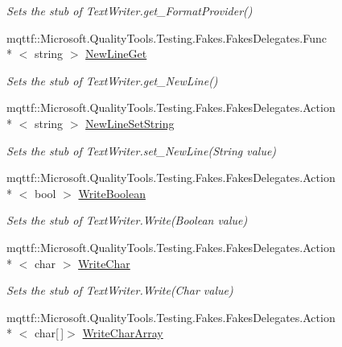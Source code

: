 \begin{DoxyCompactItemize}
\begin{DoxyCompactList}\small\item\em Sets the stub of Text\-Writer.\-get\-\_\-\-Format\-Provider()\end{DoxyCompactList}\item 
mqttf\-::\-Microsoft.\-Quality\-Tools.\-Testing.\-Fakes.\-Fakes\-Delegates.\-Func\\*
$<$ string $>$ \hyperlink{class_system_1_1_i_o_1_1_fakes_1_1_stub_text_writer_a9f4cae58e7033794acb16e4dd1cf9656}{New\-Line\-Get}
\begin{DoxyCompactList}\small\item\em Sets the stub of Text\-Writer.\-get\-\_\-\-New\-Line()\end{DoxyCompactList}\item 
mqttf\-::\-Microsoft.\-Quality\-Tools.\-Testing.\-Fakes.\-Fakes\-Delegates.\-Action\\*
$<$ string $>$ \hyperlink{class_system_1_1_i_o_1_1_fakes_1_1_stub_text_writer_aa9f304cff570080d246c029197fc800c}{New\-Line\-Set\-String}
\begin{DoxyCompactList}\small\item\em Sets the stub of Text\-Writer.\-set\-\_\-\-New\-Line(\-String value)\end{DoxyCompactList}\item 
mqttf\-::\-Microsoft.\-Quality\-Tools.\-Testing.\-Fakes.\-Fakes\-Delegates.\-Action\\*
$<$ bool $>$ \hyperlink{class_system_1_1_i_o_1_1_fakes_1_1_stub_text_writer_a58841fdc7b85161c7975c89edbf8dd3f}{Write\-Boolean}
\begin{DoxyCompactList}\small\item\em Sets the stub of Text\-Writer.\-Write(\-Boolean value)\end{DoxyCompactList}\item 
mqttf\-::\-Microsoft.\-Quality\-Tools.\-Testing.\-Fakes.\-Fakes\-Delegates.\-Action\\*
$<$ char $>$ \hyperlink{class_system_1_1_i_o_1_1_fakes_1_1_stub_text_writer_a4cc9d68d356c54a195e6263114a63837}{Write\-Char}
\begin{DoxyCompactList}\small\item\em Sets the stub of Text\-Writer.\-Write(\-Char value)\end{DoxyCompactList}\item 
mqttf\-::\-Microsoft.\-Quality\-Tools.\-Testing.\-Fakes.\-Fakes\-Delegates.\-Action\\*
$<$ char\mbox{[}$\,$\mbox{]}$>$ \hyperlink{class_system_1_1_i_o_1_1_fakes_1_1_stub_text_writer_a642224e083054f64d4a18e085fd00383}{Write\-Char\-Array}

\end{DoxyCompactItemize}
